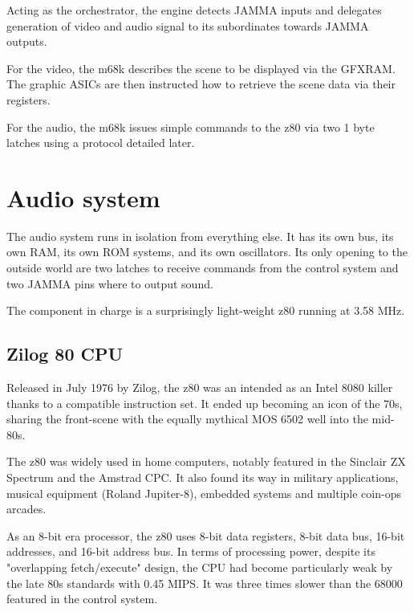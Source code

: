 Acting as the orchestrator, the engine detects JAMMA inputs and delegates generation of video and audio signal to its subordinates towards JAMMA outputs.

For the video, the m68k describes the scene to be displayed via the GFXRAM. The graphic ASICs are then instructed how to retrieve the scene data via their registers. 

For the audio, the m68k issues simple commands to the z80 via two 1 byte latches using a protocol detailed later.
  











\pagebreak
\section{Audio system}
The audio system runs in isolation from everything else. It has its own bus, its own RAM, its own ROM systems, and its own oscillators. Its only opening to the outside world are two latches to receive commands from the control system and two JAMMA pins where to output sound.

The component in charge is a surprisingly light-weight z80 running at 3.58 MHz.

\subsection{Zilog 80 CPU}
Released in July 1976 by Zilog, the z80 was an intended as an Intel 8080 killer thanks to a compatible instruction set. It ended up becoming an icon of the 70s, sharing the front-scene with the equally mythical MOS 6502 well into the mid-80s. 

The z80 was widely used in home computers, notably featured in the Sinclair ZX Spectrum and the Amstrad CPC. It also found its way in military applications, musical equipment (Roland Jupiter-8), embedded systems and multiple coin-ops arcades. 

As an 8-bit era processor, the z80 uses 8-bit data registers, 8-bit data bus, 16-bit addresses, and 16-bit address bus. In terms of processing power, despite its "overlapping fetch/execute" design, the CPU had become particularly weak by the late 80s standards with 0.45 MIPS. It was three times slower than the 68000 featured in the control system\cite{mips}. 



